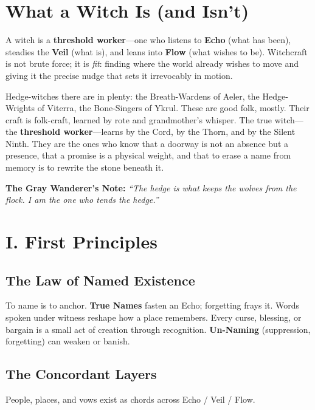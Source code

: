 \documentclass[11pt,letterpaper]{article}
\newcommand{\term}[1]{\textbf{#1}}
\begin{document}




\section*{What a Witch Is (and Isn't)}

\lettrine{A}{} witch is a \term{threshold worker}---one who listens to \term{Echo} (what has been), steadies the \term{Veil} (what is), and leans into \term{Flow} (what wishes to be). Witchcraft is not brute force; it is \textit{fit}: finding where the world already wishes to move and giving it the precise nudge that sets it irrevocably in motion.

Hedge-witches there are in plenty: the Breath-Wardens of Aeler, the Hedge-Wrights of Viterra, the Bone-Singers of Ykrul. These are good folk, mostly. Their craft is folk-craft, learned by rote and grandmother's whisper. The true witch---the \term{threshold worker}---learns by the Cord, by the Thorn, and by the Silent Ninth. They are the ones who know that a doorway is not an absence but a presence, that a promise is a physical weight, and that to erase a name from memory is to rewrite the stone beneath it.

\begin{sidebar}
\textbf{The Gray Wanderer's Note:} \textit{``The hedge is what keeps the wolves from the flock. I am the one who tends the hedge.''}
\end{sidebar}


\section{I. First Principles}

\subsection{The Law of Named Existence}
To name is to anchor. \term{True Names} fasten an Echo; forgetting frays it. Words spoken under witness reshape how a place remembers. Every curse, blessing, or bargain is a small act of creation through recognition. \term{Un-Naming} (suppression, forgetting) can weaken or banish.

\subsection{The Concordant Layers}
People, places, and vows exist as chords across Echo / Veil / Flow.
\end{document}
